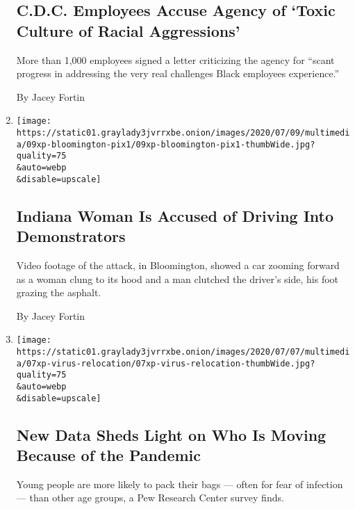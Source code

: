 \begin{enumerate}
  \hypertarget{cdc-employees-accuse-agency-of-toxic-culture-of-racial-aggressions}{%
  \subsection{C.D.C. Employees Accuse Agency of `Toxic Culture of Racial
  Aggressions'}\label{cdc-employees-accuse-agency-of-toxic-culture-of-racial-aggressions}}

  More than 1,000 employees signed a letter criticizing the agency for
  ``scant progress in addressing the very real challenges Black
  employees experience.''

  By Jacey Fortin
\item
  \href{/2020/07/09/us/bloomington-vauhxx-booker-car-protesters.html}{}

  \texttt{[image: https://static01.graylady3jvrrxbe.onion/images/2020/07/09/multimedia/09xp-bloomington-pix1/09xp-bloomington-pix1-thumbWide.jpg?quality=75\\\&auto=webp\\\&disable=upscale]}

  \hypertarget{indiana-woman-is-accused-of-driving-into-demonstrators}{%
  \subsection{Indiana Woman Is Accused of Driving Into
  Demonstrators}\label{indiana-woman-is-accused-of-driving-into-demonstrators}}

  Video footage of the attack, in Bloomington, showed a car zooming
  forward as a woman clung to its hood and a man clutched the driver's
  side, his foot grazing the asphalt.

  By Jacey Fortin
\item
  \href{/2020/07/07/us/pew-survey-coronavirus-relocation.html}{}

  \texttt{[image: https://static01.graylady3jvrrxbe.onion/images/2020/07/07/multimedia/07xp-virus-relocation/07xp-virus-relocation-thumbWide.jpg?quality=75\\\&auto=webp\\\&disable=upscale]}

  \hypertarget{new-data-sheds-light-on-who-is-moving-because-of-the-pandemic}{%
  \subsection{New Data Sheds Light on Who Is Moving Because of the
  Pandemic}\label{new-data-sheds-light-on-who-is-moving-because-of-the-pandemic}}

  Young people are more likely to pack their bags --- often for fear of
  infection --- than other age groups, a Pew Research Center survey
  finds.


\end{enumerate}
